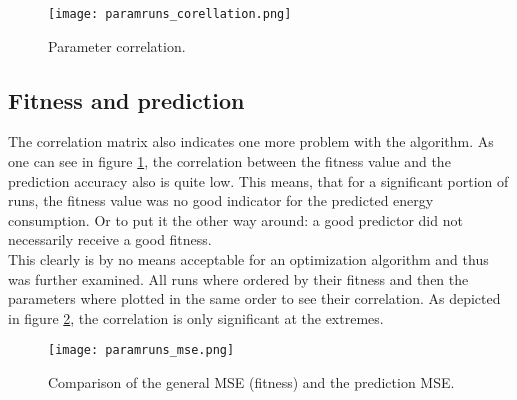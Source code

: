 \documentclass[conference]{IEEEtran}
\begin{document}
\begin{figure}[!t] 
\centering 
\texttt{[image: paramruns\_corellation.png]} 
\caption{Parameter correlation.} 
\label{fig:param_correlation} 
\end{figure}


\subsection{Fitness and prediction}
\label{sec:fitness_prediction}
The correlation matrix also indicates one more problem with the algorithm. As one can see in figure \ref{fig:param_correlation}, the correlation between the fitness value and the prediction accuracy also is quite low. This means, that for a significant portion of runs, the fitness value was no good indicator for the predicted energy consumption. Or to put it the other way around: a good predictor did not necessarily receive a good fitness.\\
This clearly is by no means acceptable for an optimization algorithm and thus was further examined. All runs where ordered by their fitness and then the parameters where plotted in the same order to see their correlation. As depicted in figure \ref{fig:mse_comparison}, the correlation is only significant at the extremes.

\begin{figure}[!t] 
\centering 
\texttt{[image: paramruns\_mse.png]} 
\caption{Comparison of the general MSE (fitness) and the prediction MSE.} 
\label{fig:mse_comparison} 
\end{figure}
\end{document}
